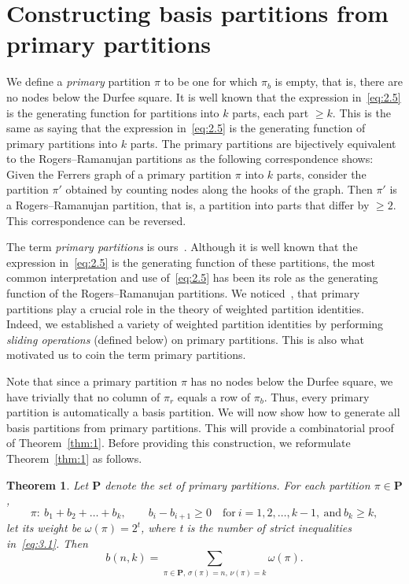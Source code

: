 \documentclass[pdftex]{sigma}
\numberwithin{equation}{section}
\newtheorem{Theorem}{Theorem}[section]
\theoremstyle{definition}
\begin{document}
\section{Constructing basis partitions from primary partitions}\label{section3}

We define a {\it primary} partition $\pi$ to be one for which $\pi_b$ is
empty, that is, there are no nodes below the Durfee square. It is well known
\cite{An-book} that the expression in~\eqref{eq:2.5} is the generating function for partitions
into $k$ parts, each part $\ge k$. This is the same as saying that the
expression in~\eqref{eq:2.5} is the generating function of primary partitions into
$k$ parts. The primary partitions are bijectively equivalent to the
Rogers--Ramanujan partitions as the following correspondence shows: Given
the Ferrers graph of a primary partition $\pi$ into $k$ parts, consider
the partition $\pi'$ obtained by counting nodes along the hooks of the
graph. Then $\pi'$ is a Rogers--Ramanujan partition, that is, a partition
into parts that differ by $\ge 2$. This correspondence can be reversed.

The term {\it primary partitions} is ours~\cite{Al0097}. Although it is well known that
the expression in~\eqref{eq:2.5} is the generating function of these partitions,
the most common interpretation and use of~\eqref{eq:2.5} has been
its role as the generating function of the Rogers--Ramanujan partitions.
We noticed~\cite{Al0097,Al0098}, that primary partitions play a crucial role in the
theory of weighted partition identities. Indeed, we established a variety
of weighted partition identities by performing {\it sliding operations}
(defined below) on primary partitions. This is also what motivated us to
coin the term primary partitions.

Note that since a primary partition $\pi$ has no nodes below the Durfee
square, we have trivially that no column of $\pi_r$ equals a row of
$\pi_b$. Thus, every primary partition is automatically a basis partition.
We will now show how to generate all basis partitions from primary
partitions. This will provide a combinatorial proof of Theorem~\ref{thm:1}.
Before providing this construction, we reformulate Theorem~\ref{thm:1} as follows.

\begin{Theorem}\label{thm:2}
Let $\mathbf{P}$ denote the set of primary partitions. For
each partition $\pi\in \mathbf{P}$,
\begin{equation}
\pi\colon\ b_1+b_2+\dots +b_k, \qquad b_i-b_{i+1}\ge 0 \quad \text{for} \
i=1,2,\dots , k-1, \ \text{and} \ b_k\ge k, \label{eq:3.1}
\end{equation}
let its weight be $\omega(\pi)=2^t$, where t is the number of
strict inequalities in~\eqref{eq:3.1}. Then
\[
b(n,k)=\sum_{\pi\in \mathbf{P},\, \sigma(\pi)=n,\, \nu(\pi)=k}\omega(\pi).
\]
\end{Theorem}
\end{document}

